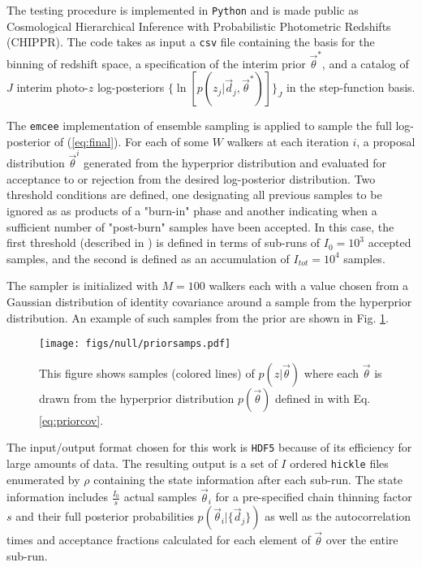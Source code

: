 The testing procedure is implemented in \texttt{Python} and is made public as 
Cosmological Hierarchical Inference with Probabilistic Photometric Redshifts 
(CHIPPR).  The code takes as input a \texttt{csv} file containing the basis for 
the binning of redshift space, a specification of the interim prior 
$\vec{\theta}^{*}$, and a catalog of $J$ interim photo-$z$ log-posteriors 
$\{\ln[p(z_{j}|\vec{d}_{j},\vec{\theta}^{*})]\}_{J}$ in the step-function basis.

The \texttt{emcee} \citep{Foreman-Mackey2013} implementation of ensemble 
sampling is applied to sample the full log-posterior of (\ref{eq:final}).   For 
each of some $W$ walkers at each iteration $i$, a proposal distribution 
$\vec{\theta}^{i}$ generated from the hyperprior distribution and evaluated for 
acceptance to or rejection from the desired log-posterior distribution.  Two 
threshold conditions are defined, one designating all previous samples to be 
ignored as as products of a "burn-in" phase and another indicating when a 
sufficient number of "post-burn" samples have been accepted.  In this case, the 
first threshold (described in ) is defined in terms of 
sub-runs of $I_{0}=10^{3}$ accepted samples, and the second is defined as an 
accumulation of $I_{tot}=10^{4}$ samples.

The sampler is initialized with $M=100$ walkers each with a value chosen from a 
Gaussian distribution of identity covariance around a sample from the 
hyperprior distribution.  An example of such samples from the prior are shown 
in Fig. \ref{fig:prior}.

\begin{figure}
	\texttt{[image: figs/null/priorsamps.pdf]}
	\caption{This figure shows samples (colored lines) of $p(z|\vec{\theta})$ where 
		each $\vec{\theta}$ is drawn from the hyperprior distribution $p(\vec{\theta})$ 
		defined in  with Eq. \ref{eq:priorcov}.}
	\label{fig:prior}
\end{figure}

The input/output format chosen for this work is \texttt{HDF5} because of its 
efficiency for large amounts of data.  The resulting output is a set of $I$ 
ordered \texttt{hickle} files enumerated by $\rho$ containing the state 
information after each sub-run.  The state information includes 
$\frac{I_{0}}{s}$ actual samples $\vec{\theta}_{i}$ for a pre-specified chain 
thinning factor $s$ and their full posterior probabilities 
$p(\vec{\theta}_{i}|\{\vec{d}_{j}\})$ as well as the autocorrelation times and 
acceptance fractions calculated for each element of $\vec{\theta}$ over the 
entire sub-run.  

